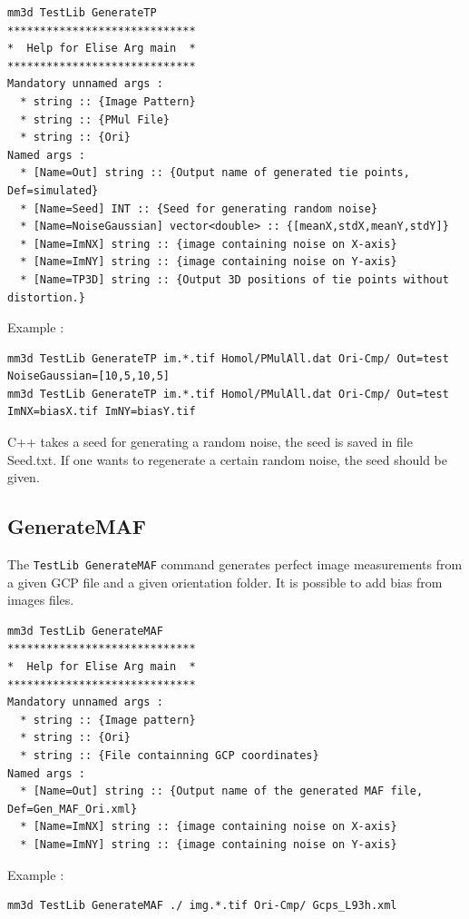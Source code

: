 \begin{verbatim}
mm3d TestLib GenerateTP
*****************************
*  Help for Elise Arg main  *
*****************************
Mandatory unnamed args : 
  * string :: {Image Pattern}
  * string :: {PMul File}
  * string :: {Ori}
Named args : 
  * [Name=Out] string :: {Output name of generated tie points, Def=simulated}
  * [Name=Seed] INT :: {Seed for generating random noise}
  * [Name=NoiseGaussian] vector<double> :: {[meanX,stdX,meanY,stdY]}
  * [Name=ImNX] string :: {image containing noise on X-axis}
  * [Name=ImNY] string :: {image containing noise on Y-axis}
  * [Name=TP3D] string :: {Output 3D positions of tie points without distortion.}

\end{verbatim}

Example :
\begin{verbatim}
mm3d TestLib GenerateTP im.*.tif Homol/PMulAll.dat Ori-Cmp/ Out=test NoiseGaussian=[10,5,10,5]
mm3d TestLib GenerateTP im.*.tif Homol/PMulAll.dat Ori-Cmp/ Out=test ImNX=biasX.tif ImNY=biasY.tif
\end{verbatim}
C++ takes a seed for generating a random noise, the seed is saved in file Seed.txt. If one wants to regenerate a certain random noise, the seed should be given.


\subsection{GenerateMAF}
The {\tt TestLib GenerateMAF} command generates perfect image measurements from a given GCP file and a given orientation folder. It is possible to add bias from images files.

\begin{verbatim}
mm3d TestLib GenerateMAF
*****************************
*  Help for Elise Arg main  *
*****************************
Mandatory unnamed args : 
  * string :: {Image pattern}
  * string :: {Ori}
  * string :: {File containning GCP coordinates}
Named args : 
  * [Name=Out] string :: {Output name of the generated MAF file, Def=Gen_MAF_Ori.xml}
  * [Name=ImNX] string :: {image containing noise on X-axis}
  * [Name=ImNY] string :: {image containing noise on Y-axis}
\end{verbatim}

Example :
\begin{verbatim}
mm3d TestLib GenerateMAF ./ img.*.tif Ori-Cmp/ Gcps_L93h.xml
\end{verbatim}



